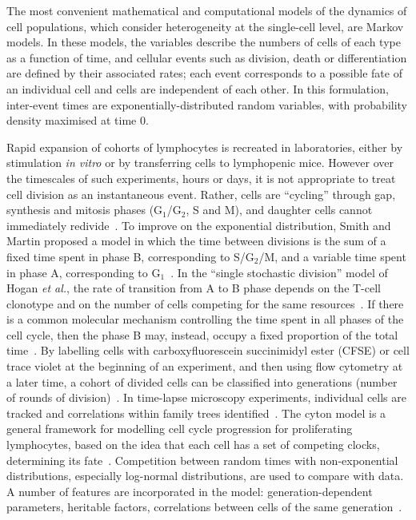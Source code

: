 \documentclass[10pt]{article}
\numberwithin{equation}{section}
\begin{document}
The most convenient mathematical and computational models of the
dynamics of cell populations, 
which consider 
heterogeneity at the 
single-cell level, are Markov models.
In these models, the variables
describe the numbers of cells of each type 
as a function of time,
and cellular events such as
division, death or differentiation are
defined by their
associated rates; each event corresponds to a possible fate of an
individual cell and cells are independent of each other. In this
formulation, inter-event times are exponentially-distributed random
variables, with probability density maximised at time $0$.

Rapid expansion of cohorts of lymphocytes is recreated in
laboratories, either by stimulation {\it in vitro} or by transferring cells
to lymphopenic mice. However over the timescales of such experiments,
hours or days, it is not appropriate to treat cell division as an
instantaneous event. Rather, cells are ``cycling'' through gap,
synthesis and mitosis phases (G$_1$/G$_2$, S and M), and daughter cells cannot immediately
redivide~\cite{pandit}. To improve on the exponential distribution, Smith and Martin
proposed a model in which the time between divisions is the sum of a
fixed time spent in phase B, corresponding to S/G$_2$/M, and a variable
time spent in phase A, corresponding to G$_1$~\cite{smith-martin}. 
In the ``single stochastic division'' model of Hogan {\em et al.},
the rate of transition from A to B phase depends on the T-cell
clonotype and on the number of cells competing for the same
resources~\cite{hogan}.
If there is a common
molecular mechanism controlling the time spent in all phases of the
cell cycle, then the phase B may, instead, occupy a fixed proportion of
the total time~\cite{dowling2014stretched}.
By labelling cells with carboxyfluorescein succinimidyl ester (CFSE) or cell trace violet at the beginning of
an experiment, and then using flow cytometry at a later time, a cohort of
divided cells can be classified into generations (number of rounds of
division)~\cite{de2006estimating,gett2000cellular,hasbold1999quantitative,lee,wellard_book}. In
time-lapse microscopy experiments, individual cells are tracked and
correlations within family trees
identified~\cite{hawkins2007model,kinjyo2015real,markham2010minimum,wellard}. The cyton model is a general
framework for modelling cell cycle progression for proliferating
lymphocytes, based on the idea that each cell has a set of competing
clocks, determining its fate~\cite{hawkins2007model}.  Competition between random
times with non-exponential distributions, especially log-normal
distributions, are used to compare with data.  A number of features
are incorporated in the model: generation-dependent parameters,
heritable factors, correlations between cells of the same
generation~\cite{duffy2009impact,markham2010minimum}.
\end{document}
